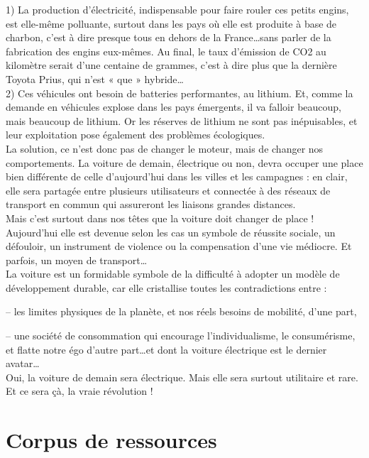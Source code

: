 \documentclass[8pt]{article}
\begin{document}
1) La production d’électricité, indispensable pour faire rouler ces petits engins, est elle-même polluante, surtout dans les pays où elle est produite à base de charbon, c’est à dire presque tous en dehors de la France…sans parler de la fabrication des engins eux-mêmes. Au final, le taux d’émission de CO2 au kilomètre serait d’une centaine de grammes, c’est à dire plus que la dernière Toyota Prius, qui n’est « que » hybride…\\

2) Ces véhicules ont besoin de batteries performantes, au lithium. Et, comme la demande en véhicules explose dans les pays émergents, il va falloir beaucoup, mais beaucoup de lithium. Or les réserves de lithium ne sont pas inépuisables, et leur exploitation pose également des problèmes écologiques.\\

La solution, ce n’est donc pas de changer le moteur, mais de changer nos comportements. La voiture de demain, électrique ou non, devra occuper une place bien différente de celle d’aujourd’hui dans les villes et les campagnes : en clair, elle sera partagée entre plusieurs utilisateurs et connectée à des réseaux de transport en commun qui assureront les liaisons grandes distances.\\

Mais c’est surtout dans nos têtes que la voiture doit changer de place ! Aujourd’hui elle est devenue selon les cas un symbole de réussite sociale, un défouloir, un instrument de violence ou la compensation d’une vie médiocre. Et parfois, un moyen de transport…\\

La voiture est un formidable symbole de la difficulté à adopter un modèle de développement durable, car elle cristallise toutes les contradictions entre :

– les limites physiques de la planète, et nos réels besoins de mobilité, d’une part,

– une société de consommation qui encourage l’individualisme, le consumérisme, et flatte notre égo d’autre part…et dont la voiture électrique est le dernier avatar…\\

Oui, la voiture de demain sera électrique. Mais elle sera surtout utilitaire et rare. Et ce sera çà, la vraie révolution !

 \newpage
\section{Corpus de ressources}
\end{document}
